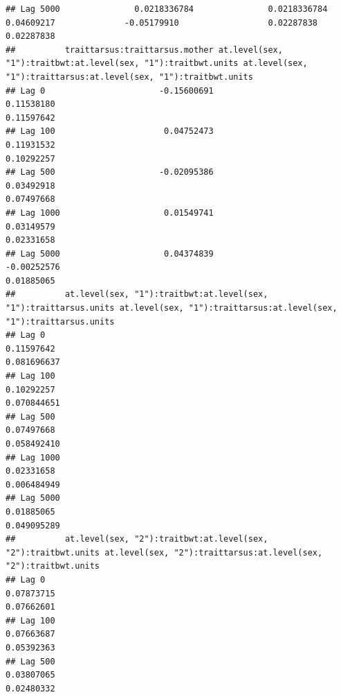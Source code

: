 \documentclass[
  12pt,
]{book}
\begin{document}
\begin{verbatim}
## Lag 5000               0.0218336784               0.0218336784                    0.04609217              -0.05179910                  0.02287838                  0.02287838
##          traittarsus:traittarsus.mother at.level(sex, "1"):traitbwt:at.level(sex, "1"):traitbwt.units at.level(sex, "1"):traittarsus:at.level(sex, "1"):traitbwt.units
## Lag 0                       -0.15600691                                                    0.11538180                                                       0.11597642
## Lag 100                      0.04752473                                                    0.11931532                                                       0.10292257
## Lag 500                     -0.02095386                                                    0.03492918                                                       0.07497668
## Lag 1000                     0.01549741                                                    0.03149579                                                       0.02331658
## Lag 5000                     0.04374839                                                   -0.00252576                                                       0.01885065
##          at.level(sex, "1"):traitbwt:at.level(sex, "1"):traittarsus.units at.level(sex, "1"):traittarsus:at.level(sex, "1"):traittarsus.units
## Lag 0                                                          0.11597642                                                         0.081696637
## Lag 100                                                        0.10292257                                                         0.070844651
## Lag 500                                                        0.07497668                                                         0.058492410
## Lag 1000                                                       0.02331658                                                         0.006484949
## Lag 5000                                                       0.01885065                                                         0.049095289
##          at.level(sex, "2"):traitbwt:at.level(sex, "2"):traitbwt.units at.level(sex, "2"):traittarsus:at.level(sex, "2"):traitbwt.units
## Lag 0                                                       0.07873715                                                       0.07662601
## Lag 100                                                     0.07663687                                                       0.05392363
## Lag 500                                                     0.03807065                                                       0.02480332

\end{verbatim}
\end{document}
